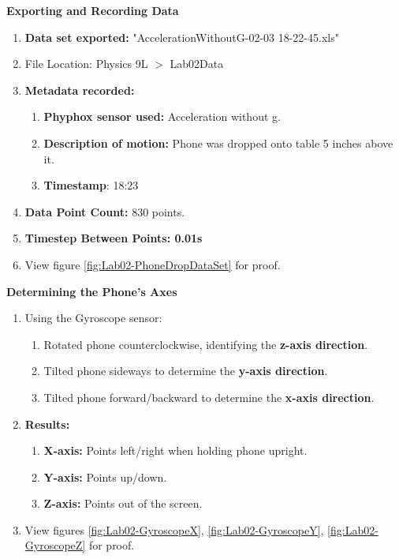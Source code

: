 \documentclass[idxtotoc,hyperref,openany]{labbook} %
\begin{document}
\textbf{Exporting and Recording Data}
\begin{enumerate}[$\bullet$]
    \item \textbf{Data set exported:} "AccelerationWithoutG-02-03 18-22-45.xls"
    \item File Location: Physics 9L $>$ Lab02\textunderscore Data
    \item \textbf{Metadata recorded:} 
    \begin{enumerate}[$\bullet$]
        \item \textbf{Phyphox sensor used:} Acceleration without g.
        \item \textbf{Description of motion:} Phone was dropped onto table 5 inches above it.
        \item \textbf{Timestamp}: 18:23
    \end{enumerate}
    \item \textbf{Data Point Count:} 830 points.
    \item \textbf{Timestep Between Points: 0.01s}
    \item View figure \ref{fig:Lab02-PhoneDropDataSet} for proof.
\end{enumerate}
\textbf{Determining the Phone’s Axes}
\begin{enumerate}[$\bullet$]
    \item Using the Gyroscope sensor:
    \begin{enumerate}[$\bullet$]
        \item Rotated phone counterclockwise, identifying the \textbf{z-axis direction}.
        \item Tilted phone sideways to determine the \textbf{y-axis direction}.
        \item Tilted phone forward/backward to determine the \textbf{x-axis direction}.
    \end{enumerate}
    \item \textbf{Results:}
    \begin{enumerate}[$\bullet$]
        \item \textbf{X-axis:} Points left/right when holding phone upright.
        \item \textbf{Y-axis:} Points up/down.
        \item \textbf{Z-axis:} Points out of the screen.
    \end{enumerate}
    \item View figures \ref{fig:Lab02-GyroscopeX}, \ref{fig:Lab02-GyroscopeY}, \ref{fig:Lab02-GyroscopeZ} for proof.
\end{enumerate}
\end{document}
